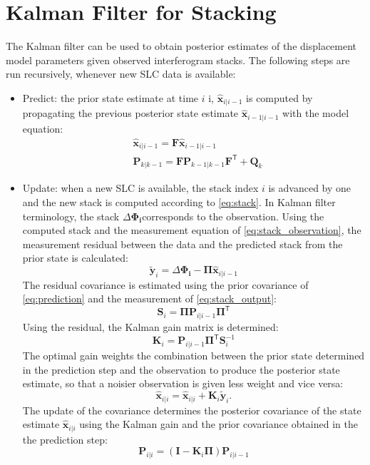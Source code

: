 \documentclass{article}
\newcommand\state[3]{{#1}_{#2\vert#3}}
\begin{document}
\section{Kalman Filter for Stacking}
The Kalman filter can be used to obtain posterior estimates of the displacement model parameters given  observed interferogram stacks. The following steps are run recursively, whenever new SLC data is available:
\begin{itemize}
	\item Predict: the prior state estimate at time $i$ i, $\state{\mathbf{\hat{x}}}{i}{i-1}$ is computed by propagating the  previous posterior state estimate $\state{\mathbf{\hat{x}}}{i-1}{i-1}$ with the model equation:
	\begin{align}\label{eq:prediction}
		&\state{\mathbf{\hat{x}}}{i}{i-1} = \mathbf{F} \state{\mathbf{\hat{x}}}{i-1}{i-1}\\
		&\state{\mathbf{P}}{k}{k-1} = \mathbf{F} \state{\mathbf{P}}{k-1}{k-1} \mathbf{F}^\mathsf{T} + \mathbf{Q}_{k}
	\end{align}
	\item Update: when a new SLC is available, the stack index $i$ is advanced by one and the new stack is computed according to \autoref{eq:stack}. In Kalman filter terminology, the stack $\Delta\mathbf{\Phi_i} $corresponds to the observation. Using the computed stack and the measurement equation of \autoref{eq:stack_observation}, the measurement residual  between the data and the predicted stack from the prior state is calculated:
	\begin{equation}
		\tilde{\mathbf{y}}_i = \Delta\mathbf{\Phi_i} - \mathbf{\Pi} \state{\mathbf{\hat{x}}}{i}{i-1}
	\end{equation}
	The residual covariance is estimated using the prior covariance of \autoref{eq:prediction}  and the measurement of \autoref{eq:stack_output}:
	\begin{equation}
		\mathbf{S}_i = \mathbf{\Pi} \state{\mathbf{P}}{i}{i-1}{\mathbf{\Pi}}^\mathsf{T}
	\end{equation}
	Using the residual, the Kalman gain matrix is determined:
	\begin{equation}
		\mathbf{K}_i = \state{\mathbf{P}}{i}{i-1}{\mathbf{\Pi}}^\mathsf{T}\mathbf{S}_i^{-1}
	\end{equation}
	The optimal gain weights the  combination between the prior state determined in the prediction step and the observation to produce the posterior state estimate, so that 
	a noisier observation is given less weight and vice versa:
	\begin{equation}
		\state{\mathbf{\hat{x}}}{i}{i} = \state{\mathbf{\hat{x}}}{i}{i} + \mathbf{K}_i \tilde{\mathbf{y}}_i.
	\end{equation}
	The update of the covariance determines the posterior covariance of the state estimate $\state{\mathbf{\hat{x}}}{i}{i}$ using the Kalman gain and the prior covariance obtained in the the prediction step:
	\begin{equation}
	\state{\mathbf{P}}{i}{i} = \left(\mathbf{I} - \mathbf{K}_i\mathbf{\Pi}\right)\state{\mathbf{P}}{i}{i-1}
	\end{equation}
\end{itemize}
\end{document}
